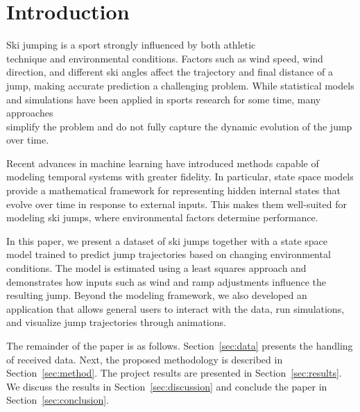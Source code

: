 \documentclass[sigconf,natbib=false, language=english]{acmart}
\begin{document}

\maketitle

\section{Introduction}


Ski jumping is a sport strongly influenced by both athletic \\
technique and environmental conditions.
Factors such as wind speed, wind direction, and different ski angles affect the trajectory 
and final distance of a jump, making accurate prediction a challenging problem. 
While statistical models and simulations have been applied in sports research for 
some time, many approaches\\ simplify the problem and do not fully capture the dynamic 
evolution of the jump over time.

Recent advances in machine learning have introduced methods capable of modeling 
temporal systems with greater fidelity. In particular, state space models provide 
a mathematical framework for representing hidden internal states that evolve over time 
in response to external inputs. This makes them well-suited for modeling ski jumps, 
where environmental factors determine performance.

In this paper, we present a dataset of ski jumps together with a state space model 
trained to predict jump trajectories based on changing environmental conditions. 
The model is estimated using a least squares approach and demonstrates how inputs 
such as wind and ramp adjustments influence the resulting jump. Beyond the modeling 
framework, we also developed an application that allows general users to interact with 
the data, run simulations, and visualize jump trajectories through animations. 

The remainder of the paper is as follows. Section~\ref{sec:data} presents the handling 
of received data. Next, the proposed methodology is described in Section~\ref{sec:method}. 
The project results are presented in Section~\ref{sec:results}. We discuss the results in 
Section~\ref{sec:discussion} and conclude the paper in Section~\ref{sec:conclusion}.
\end{document}
